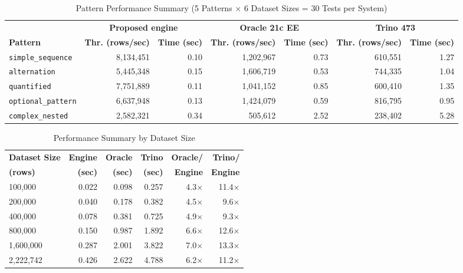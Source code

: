 \documentclass[preprint,12pt,times,a4paper]{elsarticle}
\begin{document}
\begin{table}[t]
\centering\small

\begin{adjustbox}{max width=\textwidth}
\begin{tabular}{lrrrrrr}
\toprule
 & \multicolumn{2}{c}{\textbf{Proposed engine}} & \multicolumn{2}{c}{\textbf{Oracle 21c EE}} & \multicolumn{2}{c}{\textbf{Trino 473}} \\
\cmidrule(lr){2-3}\cmidrule(lr){4-5}\cmidrule(lr){6-7}
\textbf{Pattern} & \textbf{Thr. (rows/sec)} & \textbf{Time (sec)} & \textbf{Thr. (rows/sec)} & \textbf{Time (sec)} & \textbf{Thr. (rows/sec)} & \textbf{Time (sec)} \\
\midrule
\texttt{simple\_sequence} & 8,134,451 & 0.10 & 1,202,967 & 0.73 & 610,551 & 1.27 \\
\texttt{alternation} & 5,445,348 & 0.15 & 1,606,719 & 0.53 & 744,335 & 1.04 \\
\texttt{quantified} & 7,751,889 & 0.11 & 1,041,152 & 0.85 & 600,410 & 1.35 \\
\texttt{optional\_pattern} & 6,637,948 & 0.13 & 1,424,079 & 0.59 & 816,795 & 0.95 \\
\texttt{complex\_nested} & 2,582,321 & 0.34 & 505,612 & 2.52 & 238,402 & 5.28 \\
\bottomrule
\end{tabular}
\end{adjustbox}
\caption{Pattern Performance Summary (5 Patterns $\times$ 6 Dataset Sizes = 30 Tests per System)}
\label{tab:pattern_summary}
\end{table}

\begin{table}[t]
\centering\small

\begin{tabular}{lrrrrr}
\toprule
\textbf{Dataset Size} & \textbf{Engine} & \textbf{Oracle} & \textbf{Trino} & \textbf{Oracle/} & \textbf{Trino/} \\
\textbf{(rows)} & \textbf{(sec)} & \textbf{(sec)} & \textbf{(sec)} & \textbf{Engine} & \textbf{Engine} \\
\midrule
100,000 & 0.022 & 0.098 & 0.257 & 4.3$\times$ & 11.4$\times$ \\
200,000 & 0.040 & 0.178 & 0.382 & 4.5$\times$ & 9.6$\times$ \\
400,000 & 0.078 & 0.381 & 0.725 & 4.9$\times$ & 9.3$\times$ \\
800,000 & 0.150 & 0.987 & 1.892 & 6.6$\times$ & 12.6$\times$ \\
1,600,000 & 0.287 & 2.001 & 3.822 & 7.0$\times$ & 13.3$\times$ \\
2,222,742 & 0.426 & 2.622 & 4.788 & 6.2$\times$ & 11.2$\times$ \\
\bottomrule
\end{tabular}
\caption{Performance Summary by Dataset Size}
\label{tab:size_summary}
\end{table}
\end{document}
